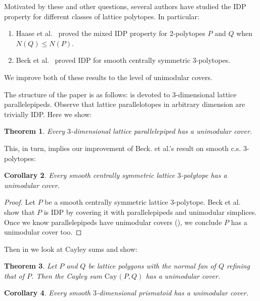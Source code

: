 \documentclass{amsart}
\theoremstyle{plain}
\newtheorem{theorem}{Theorem}[section]
\newtheorem{corollary}[theorem]{Corollary}
\theoremstyle{definition}
\newcommand{\cayley}{\ensuremath{\mathrm{Cay}}\hspace{1pt}}
\begin{document}
Motivated by these and other questions, several authors have studied the IDP property for different classes of lattice polytopes. In particular:
\begin{enumerate}
\item Haase et al.~\cite{HNPS2008} proved the mixed IDP property for $2$-polytopes $P$ and $Q$ when $N(Q) \le N(P)$.

\item Beck et al.~\cite{BHHHJKM2018} proved IDP for smooth centrally symmetric $3$-polytopes.
\end{enumerate}

We improve both of these results to the level of unimodular covers. 

The structure of the paper is as follows: 
 is devoted to $3$-dimensional lattice parallelepipeds. 
Observe that lattice parallelotopes in arbitrary dimension are trivially IDP. Here we show:

\begin{theorem}
\label{thm:parallelepipeds}
Every $3$-dimensional lattice parallelepiped has a unimodular cover.
\end{theorem}

This, in turn, implies our improvement of Beck. et al.'s result on smooth c.s. 3-polytopes:

\begin{corollary}
\label{coro:3cs}
Every smooth centrally symmetric lattice $3$-polytope has a unimodular cover. 
\end{corollary}

\begin{proof}
Let $P$ be a smooth centrally symmetric lattice $3$-polytope.
Beck et al.~\cite{BHHHJKM2018} show that $P$ is IDP by covering it with parallelepipeds and unimodular simplices. Once we know parallelepipeds have unimodular covers (), we conclude $P$ has a unimodular cover too.
\end{proof}

Then in  we look at Cayley sums and show:

\begin{theorem}
\label{thm:cayley}
Let $P$ and $Q$ be lattice polygons with the normal fan of $Q$ refining that of $P$. Then the Cayley sum $\cayley(P,Q)$ has a unimodular cover.
\end{theorem}


\begin{corollary}
\label{coro:3cs}
Every smooth $3$-dimensional prismatoid has a unimodular cover.
\end{corollary}
\end{document}
